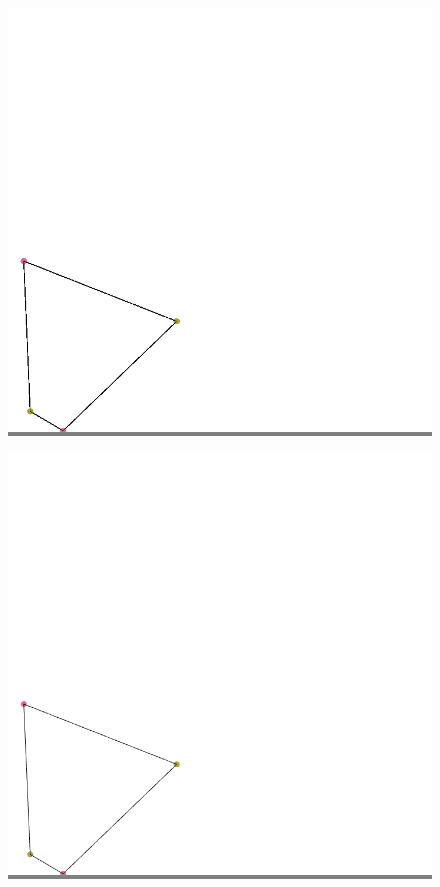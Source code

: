 \documentclass{article}
\begin{document}
\begin{figure}
\begin{minipage}{0.3\textwidth}
            \end{minipage}
            \vskip 0.1in
            \begin{minipage}{0.3\textwidth}
            \colorbox{gray}{\includegraphics[width=\linewidth]{./images/no-bridge-wt.png}}
            \end{minipage}
            \hspace{\fill}
            \begin{minipage}{0.3\textwidth}
            \colorbox{gray}{\includegraphics[width=\linewidth]{./images/backbone-wt.png}}

\end{minipage}
\end{figure}
\end{document}
